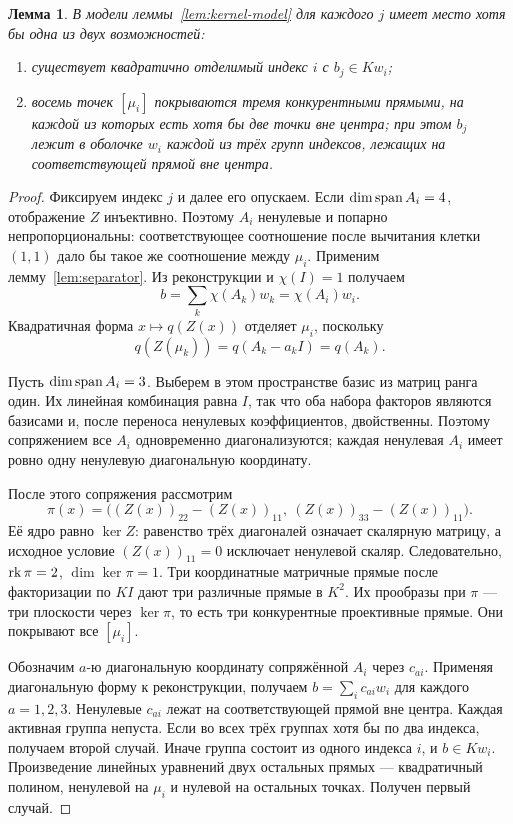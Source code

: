 \documentclass[11pt,a4paper]{article}
\numberwithin{equation}{section}
\theoremstyle{plain}
\newtheorem{lemma}[theorem]{Лемма}
\theoremstyle{definition}
\begin{document}
\begin{lemma}\label{lem:slice-dichotomy}
В модели леммы~\ref{lem:kernel-model} для каждого $j$ имеет место
хотя бы одна из двух возможностей:
\begin{enumerate}
\item существует квадратично отделимый индекс $i$ с $b_j\in Kw_i$;
\item восемь точек $[\mu_i]$ покрываются тремя конкурентными прямыми,
на каждой из которых есть хотя бы две точки вне центра;
при этом $b_j$ лежит в оболочке $w_i$ каждой из трёх групп индексов,
лежащих на соответствующей прямой вне центра.
\end{enumerate}
\end{lemma}
\begin{proof}
Фиксируем индекс $j$ и далее его опускаем.
Если $\dim\operatorname{span} A_i=4$, отображение $Z$ инъективно.
Поэтому $A_i$ ненулевые и попарно непропорциональны: соответствующее
соотношение после вычитания клетки $(1,1)$ дало бы такое же
соотношение между $\mu_i$. Применим лемму~\ref{lem:separator}.
Из реконструкции и $\chi(I)=1$ получаем
\[
 b=\sum_k\chi(A_k)w_k=\chi(A_i)w_i.
\]
Квадратичная форма $x\mapsto q(Z(x))$ отделяет $\mu_i$, поскольку
\[
 q(Z(\mu_k))=q(A_k-a_kI)=q(A_k).
\]

Пусть $\dim\operatorname{span} A_i=3$. Выберем в этом пространстве базис из матриц
ранга один. Их линейная комбинация равна $I$, так что оба набора
факторов являются базисами и, после переноса ненулевых коэффициентов,
двойственны. Поэтому сопряжением все $A_i$ одновременно
диагонализуются; каждая ненулевая $A_i$ имеет ровно одну ненулевую
диагональную координату.

После этого сопряжения рассмотрим
\[
 \pi(x)=\bigl((Z(x))_{22}-(Z(x))_{11},\
                 (Z(x))_{33}-(Z(x))_{11}\bigr).
\]
Её ядро равно $\ker Z$: равенство трёх диагоналей означает скалярную
матрицу, а исходное условие $(Z(x))_{11}=0$ исключает ненулевой скаляр.
Следовательно, $\operatorname{rk}\pi=2$, $\dim\ker\pi=1$.
Три координатные матричные прямые после факторизации по $KI$
дают три различные прямые в $K^2$. Их прообразы при $\pi$ ---
три плоскости через $\ker\pi$, то есть три конкурентные проективные
прямые. Они покрывают все $[\mu_i]$.

Обозначим $a$-ю диагональную координату сопряжённой $A_i$ через $c_{ai}$.
Применяя диагональную форму к реконструкции, получаем
$b=\sum_i c_{ai}w_i$ для каждого $a=1,2,3$.
Ненулевые $c_{ai}$ лежат на соответствующей прямой вне центра.
Каждая активная группа непуста. Если во всех трёх группах хотя бы по
два индекса, получаем второй случай. Иначе группа состоит из одного
индекса $i$, и $b\in Kw_i$. Произведение линейных уравнений двух
остальных прямых --- квадратичный полином, ненулевой на $\mu_i$
и нулевой на остальных точках. Получен первый случай.
\end{proof}
\end{document}

